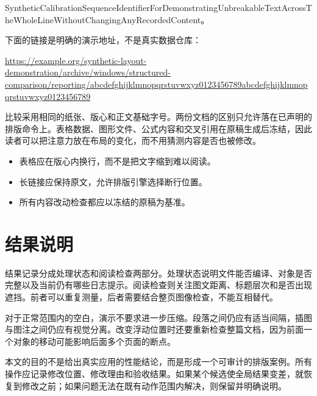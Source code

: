 \documentclass[UTF8,10pt,a4paper,fontset=windows]{ctexart}
\begin{document}
SyntheticCalibrationSequenceIdentifierForDemonstratingUnbreakableTextAcrossTheWholeLineWithoutChangingAnyRecordedContent。

下面的链接是明确的演示地址，不是真实数据仓库：

\url{https://example.org/synthetic-layout-demonstration/archive/windows/structured-comparison/reporting/abcdefghijklmnopqrstuvwxyz0123456789abcdefghijklmnopqrstuvwxyz0123456789}

比较采用相同的纸张、版心和正文基础字号。两份文档的区别只允许落在已声明的排版命令上。表格数据、图形文件、公式内容和交叉引用在原稿生成后冻结，因此读者可以把注意力放在布局的变化，而不用猜测内容是否也被修改。

\vspace{24mm}

\begin{itemize}[itemsep=20pt,topsep=20pt]
\item 表格应在版心内换行，而不是把文字缩到难以阅读。
\item 长链接应保持原文，允许排版引擎选择断行位置。
\item 所有内容改动检查都应以冻结的原稿为基准。
\end{itemize}
\section{结果说明}
结果记录分成处理状态和阅读检查两部分。处理状态说明文件能否编译、对象是否完整以及当前仍有哪些日志提示。阅读检查则关注图文距离、标题层次和是否出现遮挡。前者可以重复测量，后者需要结合整页图像检查，不能互相替代。

对于正常范围内的空白，演示不要求进一步压缩。段落之间仍应有适当间隔，插图与图注之间仍应有视觉分离。改变浮动位置时还要重新检查整篇文档，因为前面一个对象的移动可能影响后面多个页面的断点。

本文的目的不是给出真实应用的性能结论，而是形成一个可审计的排版案例。所有操作应记录修改位置、修改理由和验收结果。如果某个候选使全局结果变差，就恢复到修改之前；如果问题无法在既有动作范围内解决，则保留并明确说明。
\end{document}
